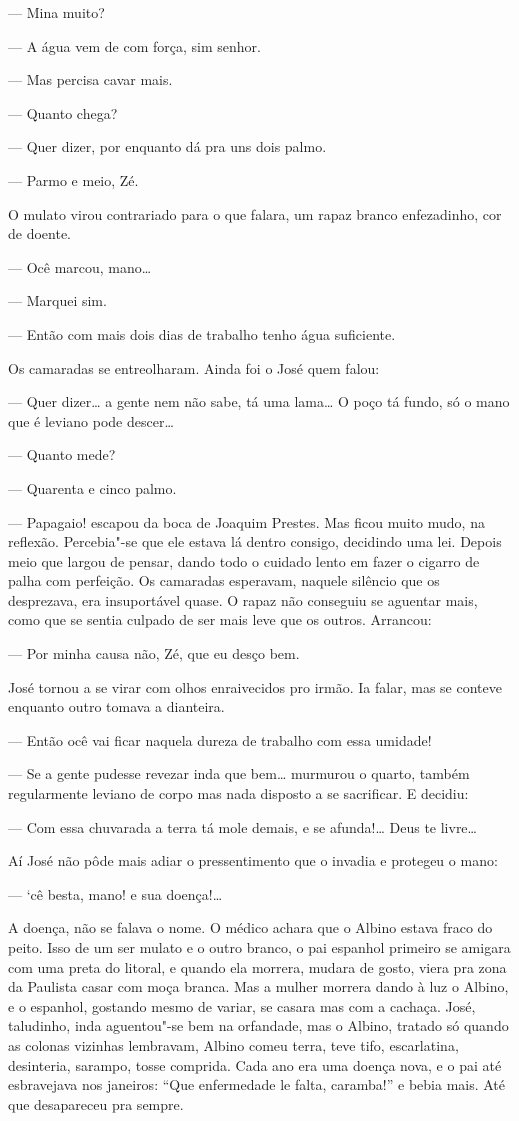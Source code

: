 --- Mina muito?

--- A água vem de com força, sim senhor.

--- Mas percisa cavar mais.

--- Quanto chega?

--- Quer dizer, por enquanto dá pra uns dois palmo.

--- Parmo e meio, Zé.

O mulato virou contrariado para o que falara, um rapaz branco
enfezadinho, cor de doente.

--- Ocê marcou, mano\ldots{}

--- Marquei sim.

--- Então com mais dois dias de trabalho tenho água suficiente.

Os camaradas se entreolharam. Ainda foi o José quem falou:

--- Quer dizer\ldots{} a gente nem não sabe, tá uma lama\ldots{} O poço tá fundo,
só o mano que é leviano pode descer\ldots{}

--- Quanto mede?

--- Quarenta e cinco palmo.

--- Papagaio! escapou da boca de Joaquim Prestes. Mas ficou muito mudo,
na reflexão. Percebia"-se que ele estava lá dentro consigo, decidindo uma
lei. Depois meio que largou de pensar, dando todo o cuidado lento em
fazer o cigarro de palha com perfeição. Os camaradas esperavam, naquele
silêncio que os desprezava, era insuportável quase. O rapaz não
conseguiu se aguentar mais, como que se sentia culpado de ser mais leve
que os outros. Arrancou:

--- Por minha causa não, Zé, que eu desço bem.

José tornou a se virar com olhos enraivecidos pro irmão. Ia falar, mas
se conteve enquanto outro tomava a dianteira.

--- Então ocê vai ficar naquela dureza de trabalho com essa umidade!

--- Se a gente pudesse revezar inda que bem\ldots{} murmurou o quarto, também
regularmente leviano de corpo mas nada disposto a se sacrificar. E
decidiu:

--- Com essa chuvarada a terra tá mole demais, e se afunda!\ldots{} Deus te
livre\ldots{}

Aí José não pôde mais adiar o pressentimento que o invadia e protegeu o
mano:

--- `cê besta, mano! e sua doença!\ldots{}

A doença, não se falava o nome. O médico achara que o Albino estava
fraco do peito. Isso de um ser mulato e o outro branco, o pai espanhol
primeiro se amigara com uma preta do litoral, e quando ela morrera,
mudara de gosto, viera pra zona da Paulista casar com moça branca. Mas a
mulher morrera dando à luz o Albino, e o espanhol, gostando mesmo de
variar, se casara mas com a cachaça. José, taludinho, inda aguentou"-se
bem na orfandade, mas o Albino, tratado só quando as colonas vizinhas
lembravam, Albino comeu terra, teve tifo, escarlatina, desinteria,
sarampo, tosse comprida. Cada ano era uma doença nova, e o pai até
esbravejava nos janeiros: ``Que enfermedade le falta, caramba!'' e bebia
mais. Até que desapareceu pra sempre.

